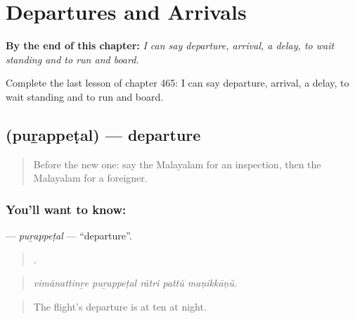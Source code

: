 
\chapter{Departures and Arrivals}
\label{ch:ml-departures-and-arrivals}

\begin{chapteropening}
\textbf{By the end of this chapter:} \emph{I can say departure, arrival, a delay, to wait standing and to run and board.}

Complete the last lesson of chapter 465: I can say departure, arrival, a delay, to wait standing and to run and board.
\end{chapteropening}

\section[\texorpdfstring{\ml{പുറപ്പെടൽ} (puṟappeṭal)}{പുറപ്പെടൽ (puṟappeṭal)}]{ (puṟappeṭal) — departure}

\label{lesson:ML-C465-purappetal}



\begin{quote}
Before the new one: say the Malayalam for an inspection, then the Malayalam for a foreigner.
\end{quote}

\subsection*{You'll want to know: }
\textbf{} — \emph{puṟappeṭal} — \textquotedblleft{}departure\textquotedblright{}.

\begin{quote}
    .
\end{quote}

\begin{quote}
\emph{vimānattinṟe puṟappeṭal rātri pattŭ maṇikkāṇŭ.}
\end{quote}

\begin{quote}
The flight's departure is at ten at night.
\end{quote}


